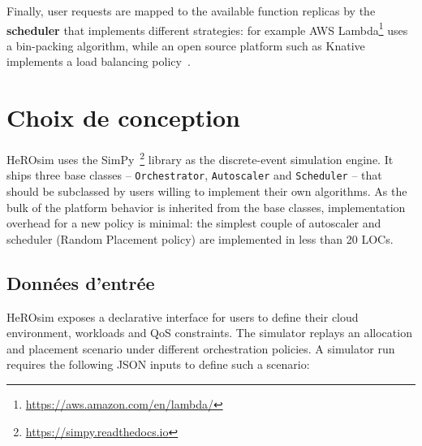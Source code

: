 Finally, user requests are mapped to the available function replicas by the \textbf{scheduler} that implements different strategies: for example AWS Lambda\footnote{\href{https://aws.amazon.com/en/lambda/}{https://aws.amazon.com/en/lambda/}} uses a bin-packing algorithm, while an open source platform such as Knative implements a load balancing policy~\cite{Lannurien2023}. %

\section{Choix de conception}
\label{section:herosim-herosim}



HeROsim uses the SimPy~\footnote{\href{https://simpy.readthedocs.io}{https://simpy.readthedocs.io}} library as the discrete-event simulation engine. It ships three base classes -- \texttt{Orchestrator}, \texttt{Autoscaler} and \texttt{Scheduler} -- that should be subclassed by users willing to implement their own  algorithms. As the bulk of the platform behavior is inherited from the base classes, implementation overhead for a new policy is minimal: the simplest couple of autoscaler and scheduler (Random Placement policy) are implemented in less than 20 LOCs.

\subsection{Données d'entrée}

HeROsim exposes a declarative interface for users to define their cloud environment, workloads and QoS constraints. The simulator replays an allocation and placement scenario under different orchestration policies. A simulator run requires the following JSON inputs to define such a scenario:


